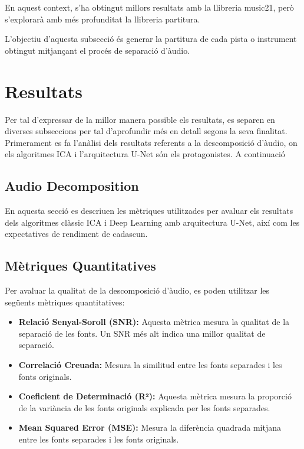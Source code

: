 \documentclass[10pt,a4paper,twocolumn,twoside]{article}
\begin{document}
En aquest context, s'ha obtingut millors resultats amb la llibreria music21, però s'explorarà amb més profunditat la llibreria partitura.

L'objectiu d'aquesta subsecció és generar la partitura de cada pista o instrument obtingut mitjançant el procés de separació d'àudio.

\section{Resultats}
Per tal d'expressar de la millor manera possible els resultats, es separen en diverses subseccions per tal d'aprofundir més en detall segons la seva finalitat. Primerament es fa l'anàlisi dels resultats referents a la descomposició d'àudio, on els algoritmes ICA i l'arquitectura U-Net són els protagonistes.
A continuació 

\subsection{Audio Decomposition}

En aquesta secció es descriuen les mètriques utilitzades per avaluar els resultats dels algoritmes clàssic ICA i Deep Learning amb arquitectura U-Net, així com les expectatives de rendiment de cadascun.

\subsection{Mètriques Quantitatives}

Per avaluar la qualitat de la descomposició d'àudio, es poden utilitzar les següents mètriques quantitatives:

\begin{itemize}
    \item \textbf{Relació Senyal-Soroll (SNR):} \cite{Johnson:2006_SNR} Aquesta mètrica mesura la qualitat de la separació de les fonts. Un SNR més alt indica una millor qualitat de separació.
    
    \item \textbf{Correlació Creuada:} Mesura la similitud entre les fonts separades i les fonts originals. 
    
    \item \textbf{Coeficient de Determinació (R²):} \cite{akossou2013impact_r_squared} Aquesta mètrica mesura la proporció de la variància de les fonts originals explicada per les fonts separades.
    
    \item \textbf{Mean Squared Error (MSE):} \cite{5937917_MSE} Mesura la diferència quadrada mitjana entre les fonts separades i les fonts originals.
\end{itemize}
\end{document}
